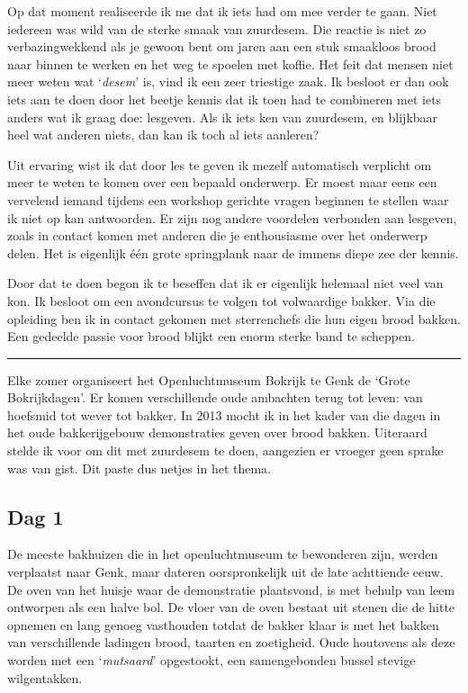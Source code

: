 \documentclass[
  11pt,
  dutch,
]{memoir}
\begin{document}
Op dat moment realiseerde ik me dat ik iets had om mee verder te gaan.
Niet iedereen was wild van de sterke smaak van zuurdesem. Die reactie is
niet zo verbazingwekkend als je gewoon bent om jaren aan een stuk
smaakloos brood naar binnen te werken en het weg te spoelen met koffie.
Het feit dat mensen niet meer weten wat `\emph{desem}' is, vind ik een
zeer triestige zaak. Ik besloot er dan ook iets aan te doen door het
beetje kennis dat ik toen had te combineren met iets anders wat ik graag
doe: lesgeven. Als ik iets ken van zuurdesem, en blijkbaar heel wat
anderen niets, dan kan ik toch al iets aanleren?

Uit ervaring wist ik dat door les te geven ik mezelf automatisch
verplicht om meer te weten te komen over een bepaald onderwerp. Er moest
maar eens een vervelend iemand tijdens een workshop gerichte vragen
beginnen te stellen waar ik niet op kan antwoorden. Er zijn nog andere
voordelen verbonden aan lesgeven, zoals in contact komen met anderen die
je enthousiasme over het onderwerp delen. Het is eigenlijk één grote
springplank naar de immens diepe zee der kennis.

Door dat te doen begon ik te beseffen dat ik er eigenlijk helemaal niet
veel van kon. Ik besloot om een avondcursus te volgen tot volwaardige
bakker. Via die opleiding ben ik in contact gekomen met sterrenchefs die
hun eigen brood bakken. Een gedeelde passie voor brood blijkt een enorm
sterke band te scheppen.

\pfbreak

Elke zomer organiseert het Openluchtmuseum Bokrijk te Genk de `Grote
Bokrijkdagen'. Er komen verschillende oude ambachten terug tot leven:
van hoefsmid tot wever tot bakker. In 2013 mocht ik in het kader van die
dagen in het oude bakkerijgebouw demonstraties geven over brood bakken.
Uiteraard stelde ik voor om dit met zuurdesem te doen, aangezien er
vroeger geen sprake was van gist. Dit paste dus netjes in het thema.

\hypertarget{dag-1}{%
\subsection{Dag 1}\label{dag-1}}

De meeste bakhuizen die in het openluchtmuseum te bewonderen zijn,
werden verplaatst naar Genk, maar dateren oorspronkelijk uit de late
achttiende eeuw. De oven van het huisje waar de demonstratie plaatsvond,
is met behulp van leem ontworpen als een halve bol. De vloer van de oven
bestaat uit stenen die de hitte opnemen en lang genoeg vasthouden totdat
de bakker klaar is met het bakken van verschillende ladingen brood,
taarten en zoetigheid. Oude houtovens als deze worden met een
`\emph{mutsaard}' opgestookt, een samengebonden bussel stevige
wilgentakken.
\end{document}
